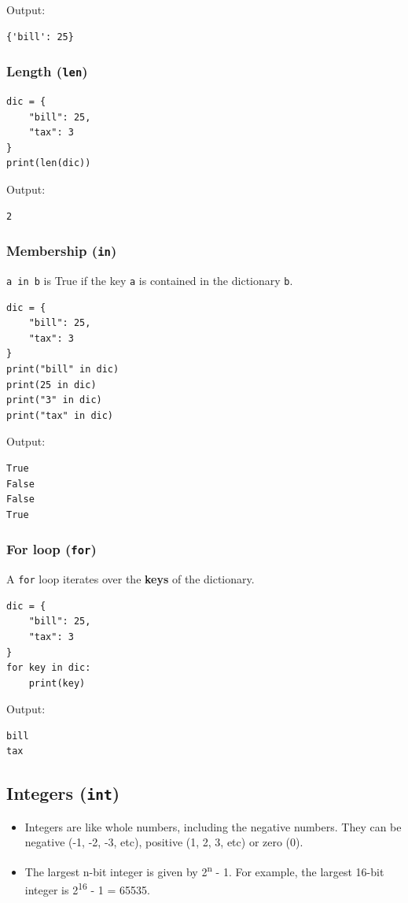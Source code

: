 \documentclass[11pt]{article}
\begin{document}
 \noindent Output:

\begin{verbatim}
{'bill': 25}
\end{verbatim}

\subsubsection{Length (\texttt{len})}
\label{sec:org1eb5ff3}
\begin{verbatim}
dic = {
    "bill": 25,
    "tax": 3
}
print(len(dic))
\end{verbatim}

 \noindent Output:

\begin{verbatim}
2
\end{verbatim}

\subsubsection{Membership (\texttt{in})}
\label{sec:org3a8928f}
\texttt{a in b} is True if the key \texttt{a} is contained in the dictionary \texttt{b}.
\begin{verbatim}
dic = {
    "bill": 25,
    "tax": 3
}
print("bill" in dic)
print(25 in dic)
print("3" in dic)
print("tax" in dic)
\end{verbatim}

 \noindent Output:

\begin{verbatim}
True
False
False
True
\end{verbatim}


 \newpage

\subsubsection{For loop (\texttt{for})}
\label{sec:orgd980a54}
A \texttt{for} loop iterates over the \textbf{keys} of the dictionary.
\begin{verbatim}
dic = {
    "bill": 25,
    "tax": 3
}
for key in dic:
    print(key)
\end{verbatim}

 \noindent Output:

\begin{verbatim}
bill
tax
\end{verbatim}

\subsection{Integers (\texttt{int})}
\label{sec:orgc165592}
\begin{itemize}
\item Integers are like whole numbers, including the negative numbers. They can be negative (-1, -2, -3, etc), positive (1, 2, 3, etc) or zero (0).
\item The largest n-bit integer is given by 2\textsuperscript{n} - 1. For example, the largest 16-bit integer is 2\textsuperscript{16} - 1 = 65535.
\end{itemize}
\end{document}
